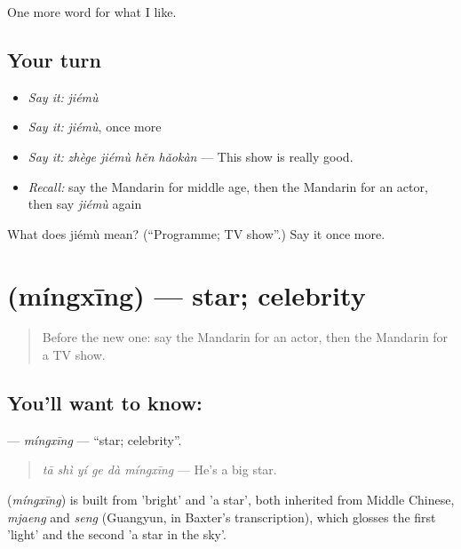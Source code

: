 \begin{grammarlens}[title={What you've built}]
One more word for what I like.
\end{grammarlens}

\subsection*{Your turn}
\begin{itemize}
\raggedright
  \item \emph{Say it:} \emph{jiémù}
  \item \emph{Say it:} \emph{jiémù}, once more
  \item \emph{Say it:} \emph{zhège jiémù hěn hǎokàn} — This show is really good.
  \item \emph{Recall:} say the Mandarin for middle age, then the Mandarin for an actor, then say \emph{jiémù} again
\end{itemize}

\begin{tcolorbox}[breakable,colback=teal!4,colframe=teal!35!black,title={Before you move on}]
What does jiémù mean? (\textquotedblleft{}Programme; TV show\textquotedblright{}.) Say it once more.
\end{tcolorbox}
\section[\texorpdfstring{\zh{明星} (míngxīng)}{明星 (míngxīng)}]{ (míngxīng) — star; celebrity}

\label{lesson:ZH-C267-mingxing}



\begin{quote}
Before the new one: say the Mandarin for an actor, then the Mandarin for a TV show.
\end{quote}

\subsection*{You'll want to know: }
\textbf{} — \emph{míngxīng} — \textquotedblleft{}star; celebrity\textquotedblright{}.

\begin{quote}
\textbf{} \emph{tā shì yí ge dà míngxīng} — He's a big star.
\end{quote}

\begin{cousinweb}
\textbf{} (\emph{míngxīng}) is built from  'bright' and  'a star', both inherited from Middle Chinese, \emph{mjaeng} and \emph{seng} (Guangyun, in Baxter's transcription), which glosses the first 'light' and the second 'a star in the sky'.
\end{cousinweb}

